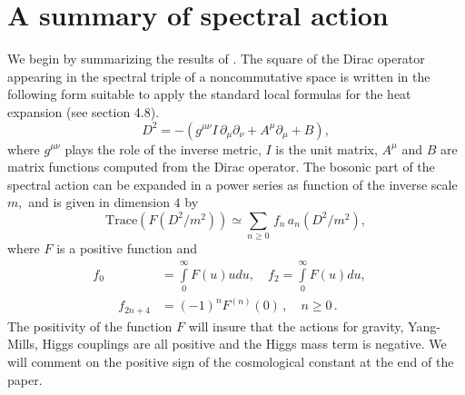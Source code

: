 \documentclass[12pt]{article}%
\begin{document}
\section{\bigskip A summary of spectral action}

We begin by summarizing the results of \cite{ACAC}. The square of the Dirac
operator appearing in the spectral triple of a noncommutative space is written
in the following form suitable to apply the standard local formulas for the
heat expansion (see \cite{Gilkey} section 4.8).
\begin{equation}
D^{2}=-\left(  g^{\mu\nu}I\,\partial_{\mu}\partial_{\nu}+A^{\mu}\partial_{\mu
}+B\right)  ,\label{opdata}%
\end{equation}
where $g^{\mu\nu}$ plays the role of the inverse metric, $I$ is the unit
matrix, $A^{\mu}$ and $B$ are matrix functions computed from the Dirac
operator. The bosonic part of the spectral action can be expanded in a power
series as function of the inverse scale $m,$ and is given in dimension $4$ by
\[
\mathrm{Trace}\left(  F\left(  D^{2}/m^{2}\right)  \right)  \simeq%
{\displaystyle\sum\limits_{n\geq0}}
\,f_{n}\,a_{n}\left(  D^{2}/m^{2}\right)  ,
\]
where $F$ is a positive function and
\begin{align}
f_{0} &  =%
{\displaystyle\int\limits_{0}^{\infty}}
F\left(  u\right)  udu,\quad f_{2}=%
{\displaystyle\int\limits_{0}^{\infty}}
F\left(  u\right)  du,\quad\label{fncoeffs}\\
\qquad f_{2n+4} &  =\left(  -1\right)  ^{n}F^{\left(  n\right)  }\left(
0\right)  \,,\quad n\geq0\,.\nonumber
\end{align}
The positivity of the function $F$ will insure that the actions for gravity,
Yang-Mills, Higgs couplings are all positive and the Higgs mass term is
negative. We will comment on the positive sign of the cosmological constant at
the end of the paper.
\end{document}
